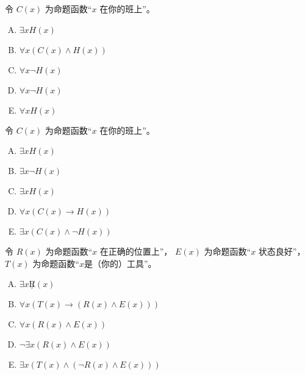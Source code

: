 {{        %
        \begin{practices}
            令 $C(x)$ 为命题函数``$x$ 在你的班上''。
            \begin{enumerate}[A.]
                \item $\exists x H(x)$
                \item $\forall x (C(x) \wedge H(x))$
                \item $\forall x \neg H(x)$
                \item $\forall x \neg H(x)$
                \item $\forall x H(x)$
            \end{enumerate}
        \end{practices}

        \begin{practices}
            令 $C(x)$ 为命题函数``$x$ 在你的班上''。
            \begin{enumerate}[A.]
                \item $\exists x H(x)$
                \item $\exists x \neg H(x)$
                \item $\exists x H(x)$
                \item $\forall x (C(x) \rightarrow H(x))$
                \item $\exists x (C(x) \wedge \neg H(x))$
            \end{enumerate}
        \end{practices}

        \begin{practices}
            令 $R(x)$ 为命题函数``$x$ 在正确的位置上''， $E(x)$ 为命题函数``$x$ 状态良好''， $T(x)$ 为命题函数``$x$是（你的）工具''。
            \begin{enumerate}[A.]
                \item $\exists x \not R(x)$
                \item $\forall x (T(x) \rightarrow (R(x) \wedge E(x)))$
                \item $\forall x (R(x) \wedge E(x))$
                \item $\neg \exists x (R(x) \wedge E(x))$
                \item $\exists x (T(x) \wedge (\neg R(x) \wedge E(x)))$
            \end{enumerate}
        \end{practices}

}}
